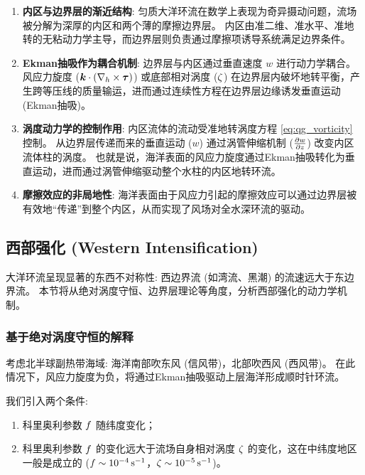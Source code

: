 \begin{insightbox}[风生洋流匀质模式的物理图景]
    \begin{enumerate}
        \item \textbf{内区与边界层的渐近结构}:
        匀质大洋环流在数学上表现为奇异摄动问题，流场被分解为深厚的内区和两个薄的摩擦边界层。
        内区由准二维、准水平、准地转的无粘动力学主导，而边界层则负责通过摩擦项诱导系统满足边界条件。

        \item \textbf{Ekman抽吸作为耦合机制}:
        边界层与内区通过垂直速度 $w$ 进行动力学耦合。
        风应力旋度 ($\bm{k} \cdot (\nabla_h \times {\bm{\tau}})$) 或底部相对涡度 ($\zeta$) 在边界层内破坏地转平衡，产生跨等压线的质量输运，进而通过连续性方程在边界层边缘诱发垂直运动 (Ekman抽吸)。

        \item \textbf{涡度动力学的控制作用}:
        内区流体的流动受准地转涡度方程 \eqref{eq:qg_vorticity} 控制。
        从边界层传递而来的垂直运动 ($w$) 通过涡管伸缩机制 ($\pde{w}{z}$) 改变内区流体柱的涡度。
        也就是说，海洋表面的风应力旋度通过Ekman抽吸转化为垂直运动，进而通过涡管伸缩驱动整个水柱的内区地转环流。

        \item \textbf{摩擦效应的非局地性}:
        海洋表面由于风应力引起的摩擦效应可以通过边界层被有效地“传递”到整个内区，从而实现了风场对全水深环流的驱动。
    \end{enumerate}
\end{insightbox}

\subsection{西部强化 (Western Intensification)}

大洋环流呈现显著的东西不对称性: 西边界流 (如湾流、黑潮) 的流速远大于东边界流。
本节将从绝对涡度守恒、边界层理论等角度，分析西部强化的动力学机制。

\subsubsection{基于绝对涡度守恒的解释}

考虑北半球副热带海域: 海洋南部吹东风 (信风带)，北部吹西风 (西风带)。
在此情况下，风应力旋度为负，将通过Ekman抽吸驱动上层海洋形成顺时针环流。

我们引入两个条件:
\begin{enumerate}
    \item 科里奥利参数 $f$ 随纬度变化；
    \item 科里奥利参数 $f$ 的变化远大于流场自身相对涡度 $\zeta$ 的变化，这在中纬度地区一般是成立的 ($f \sim 10^{-4}\,\mathrm{s^{-1}}$，$\zeta \sim 10^{-5}\,\mathrm{s^{-1}}$)。
\end{enumerate}

